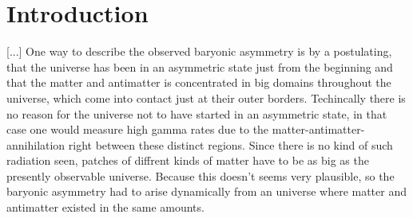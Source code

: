 \section{Introduction}
[...]
One way to describe the observed baryonic asymmetry is by a postulating, that the universe has been in an asymmetric state just from the beginning and that the matter and antimatter is concentrated in big domains throughout the universe, which come into contact just at their outer borders. Techincally there is no reason for the universe not to have started in an asymmetric state, in that case one would measure high gamma rates due to the matter-antimatter-annihilation right between these distinct regions. \newline
Since there is no kind of such radiation seen, patches of diffrent kinds of matter have to be as big as the presently observable universe. Because this doesn't seems very plausible, so the baryonic asymmetry had to arise dynamically from an universe where matter and antimatter existed in the same amounts. \newline
[...]\newpage
